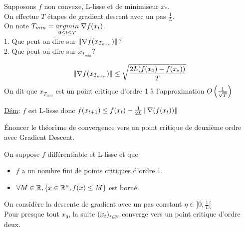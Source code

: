 \begin{note}
  \begin{field}
    Supposons $f$ non convexe, L-lisse et de minimiseur $x_*$.\\
    On effectue $T$ étapes de
    gradient descent avec un pas $\frac{1}{L}$.\\
    On note $T_{min} =
    \underset{0\leq t \leq T}{argmin}\;\nabla f(x_t)$. \\
    1. Que peut-on dire sur $\left\lVert\nabla f(x_{T_{min}})\right\rVert$? \\
    2. Que peut-on dire sur $x_{T_{min}}$?
  \end{field}
  \begin{field}
    $$\left\lVert\nabla f(x_{T_{min}})\right\rVert \leq \sqrt{\frac{2L(f(x_0) -
        f(x_*))}{T}}$$
    On dit que $x_{T_{min}}$ est un point critique d'ordre 1 à
    l'approximation $O\left(\frac{1}{\sqrt{T}}\right)$
  \end{field}
  \begin{field}
    \underline{Dém}: $f$ est L-lisse donc $f(x_{t+1}) \leq f(x_t) -
    \frac{1}{2L}\left\lVert\nabla(f(x_{t}))\right\rVert$
  \end{field}
\end{note}



\begin{note}
  \begin{field}
    Énoncer le théorème de convergence vers un point critique de deuxième ordre
    avec Gradient Descent.
  \end{field}
  \begin{field}
    On suppose $f$ différentiable et L-lisse et que
    \begin{itemize}
    \item $f$ a un nombre fini de points critiques d'ordre 1.
    \item $\forall M \in \mathbb{R},\{x \in \mathbb{R}^n, f(x) \leq M\}$ est borné.
    \end{itemize}
    On considère la descente de gradient avec un pas constant $\eta \in
    ]0, \frac{1}{L}[$\\
    Pour presque tout $x_0$, la suite $\left(x_t\right)_{t \in \mathbb{N}}$
    converge vers un point critique d'ordre deux.
  \end{field}
  \begin{field}

  \end{field}
\end{note}


